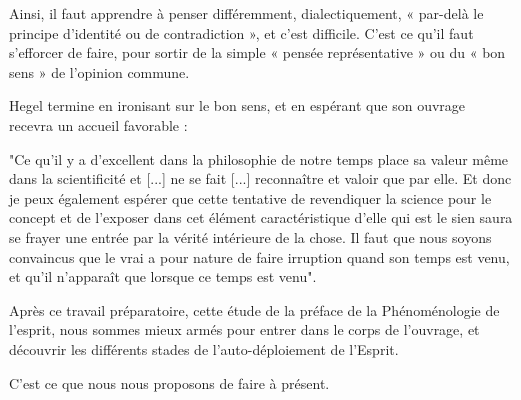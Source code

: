 Ainsi, il faut apprendre à penser différemment, dialectiquement, « par-delà le principe d’identité ou de contradiction », et c’est difficile. C’est ce qu’il faut s’efforcer de faire, pour sortir de la simple « pensée représentative » ou du « bon sens » de l’opinion commune.

Hegel termine en ironisant sur le bon sens, et en espérant que son ouvrage recevra un accueil favorable :

"Ce qu’il y a d’excellent dans la philosophie de notre temps place sa valeur même dans la scientificité et [...] ne se fait [...] reconnaître et valoir que par elle. Et donc je peux également espérer que cette tentative de revendiquer la science pour le concept et de l’exposer dans cet élément caractéristique d’elle qui est le sien saura se frayer une entrée par la vérité intérieure de la chose. Il faut que nous soyons convaincus que le vrai a pour nature de faire irruption quand son temps est venu, et qu’il n’apparaît que lorsque ce temps est venu".


Après ce travail préparatoire, cette étude de la préface de la Phénoménologie de l’esprit, nous sommes mieux armés pour entrer dans le corps de l’ouvrage, et découvrir les différents stades de l’auto-déploiement de l’Esprit.

C’est ce que nous nous proposons de faire à présent.
